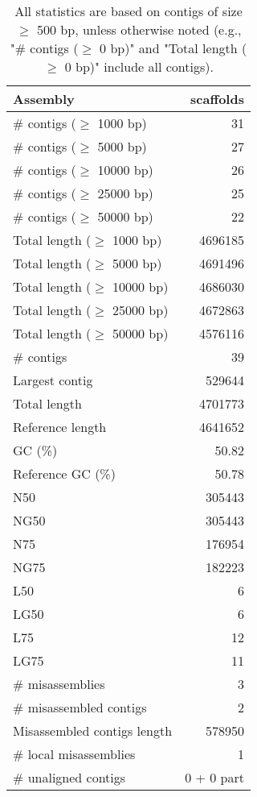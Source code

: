 \documentclass[12pt,a4paper]{article}
\begin{document}
\begin{table}[ht]
\begin{center}
\caption{All statistics are based on contigs of size $\geq$ 500 bp, unless otherwise noted (e.g., "\# contigs ($\geq$ 0 bp)" and "Total length ($\geq$ 0 bp)" include all contigs).}
\begin{tabular}{|l*{1}{|r}|}
\hline
Assembly & scaffolds \\ \hline
\# contigs ($\geq$ 1000 bp) & 31 \\ \hline
\# contigs ($\geq$ 5000 bp) & 27 \\ \hline
\# contigs ($\geq$ 10000 bp) & 26 \\ \hline
\# contigs ($\geq$ 25000 bp) & 25 \\ \hline
\# contigs ($\geq$ 50000 bp) & 22 \\ \hline
Total length ($\geq$ 1000 bp) & 4696185 \\ \hline
Total length ($\geq$ 5000 bp) & 4691496 \\ \hline
Total length ($\geq$ 10000 bp) & 4686030 \\ \hline
Total length ($\geq$ 25000 bp) & 4672863 \\ \hline
Total length ($\geq$ 50000 bp) & 4576116 \\ \hline
\# contigs & 39 \\ \hline
Largest contig & 529644 \\ \hline
Total length & 4701773 \\ \hline
Reference length & 4641652 \\ \hline
GC (\%) & 50.82 \\ \hline
Reference GC (\%) & 50.78 \\ \hline
N50 & 305443 \\ \hline
NG50 & 305443 \\ \hline
N75 & 176954 \\ \hline
NG75 & 182223 \\ \hline
L50 & 6 \\ \hline
LG50 & 6 \\ \hline
L75 & 12 \\ \hline
LG75 & 11 \\ \hline
\# misassemblies & 3 \\ \hline
\# misassembled contigs & 2 \\ \hline
Misassembled contigs length & 578950 \\ \hline
\# local misassemblies & 1 \\ \hline
\# unaligned contigs & 0 + 0 part \\ \hline

\end{tabular}
\end{center}
\end{table}
\end{document}
